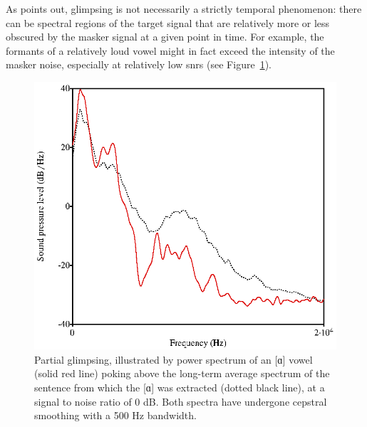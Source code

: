 
As \citet{Cooke2006} points out, glimpsing is not necessarily a strictly temporal phenomenon: there can be spectral regions of the target signal that are relatively more or less obscured by the masker signal at a given point in time.  For example, the formants of a relatively loud vowel might in fact exceed the intensity of the masker noise, especially at relatively low \ac{snr}s (see Figure~\ref{fig:PartialGlimpsing}).

\begin{figure}[htbp]
	\begin{centering}
	\includegraphics{figures/partialGlimpsing.eps}
	\caption[Partial glimpsing of an {[ɑ]} vowel]{Partial glimpsing, illustrated by power spectrum of an [ɑ] vowel (solid red line) poking above the long-term average spectrum of the sentence from which the [ɑ] was extracted (dotted black line), at a signal to noise ratio of 0 dB. Both spectra have undergone cepstral smoothing with a 500 Hz bandwidth.\label{fig:PartialGlimpsing}}
	\end{centering}
\end{figure}

